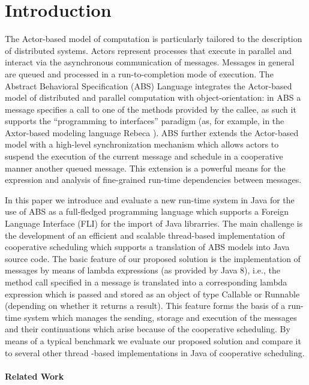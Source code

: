 \section{Introduction}

The Actor-based model of computation \cite{Agha} is particularly tailored to the description of distributed systems.  Actors represent processes that execute in parallel and interact via the asynchronous communication of messages.
Messages in general are queued and processed in a run-to-completion mode of execution.
The  Abstract Behavioral Specification (ABS) \cite{abs}  Language  integrates the Actor-based model of distributed and parallel computation with object-orientation:
in ABS a message specifies a  call to one of the methods provided by the callee,
as such it supports the ``programming to interfaces'' paradigm (as, for example, in the Axtor-based modeling language Rebeca \cite{Sirjani}).
ABS further  extends the Actor-based model with  a high-level synchronization mechanism which allows actors to suspend the
execution of the current message and schedule in a cooperative manner another
queued message.  This  extension  is a powerful means for the expression and analysis
of fine-grained run-time dependencies between messages.

In this paper we introduce  and evaluate a new run-time system in Java for  the use of ABS as a full-fledged programming language which supports a Foreign Language Interface (FLI) for the import of Java librarries. The main challenge is the development of an efficient and scalable  thread-based implementation of cooperative scheduling
which supports a translation of ABS models into Java source code.
The basic feature of our proposed solution is the implementation of messages by means of
lambda expressions (as provided by Java 8), i.e., the method call specified in a message
is translated into a corresponding lambda expression which is passed and stored as
an object of type Callable or Runnable (depending on whether it returns  a result).
This  feature forms  the basis of a run-time system which manages
the sending, storage and execution of  the messages and their continuations
which arise because of the cooperative scheduling.
By means of a typical benchmark we evaluate our proposed solution and compare it
to several other thread -based implementations in Java of cooperative scheduling.

\paragraph{Related Work}

